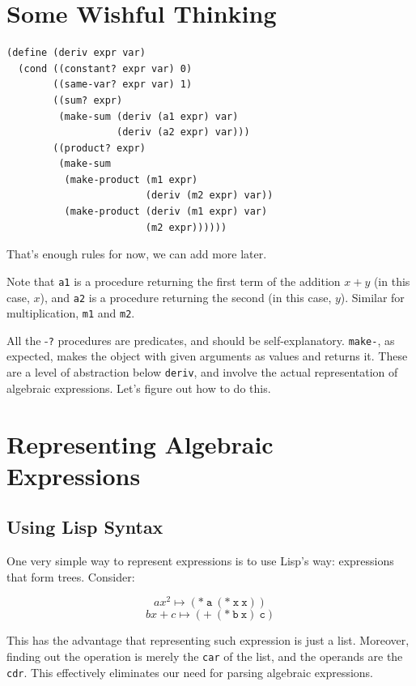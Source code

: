 \documentclass[9pt]{report}
\begin{document}
\section{Some Wishful Thinking}
\label{sec:org9d9e4e3}

\begin{verbatim}
(define (deriv expr var)
  (cond ((constant? expr var) 0)
        ((same-var? expr var) 1)
        ((sum? expr)
         (make-sum (deriv (a1 expr) var)
                   (deriv (a2 expr) var)))
        ((product? expr)
         (make-sum
          (make-product (m1 expr)
                        (deriv (m2 expr) var))
          (make-product (deriv (m1 expr) var)
                        (m2 expr))))))
\end{verbatim}


That's enough rules for now, we can add more later.

Note that \texttt{a1} is a procedure returning the first term of the
addition \(x+y\) (in this case, \(x\)), and \texttt{a2} is a procedure
returning the second (in this case, \(y\)). Similar for
multiplication, \texttt{m1} and \texttt{m2}.

All the -\texttt{?} procedures are predicates, and should be
self-explanatory. \texttt{make-}, as expected, makes the object with given
arguments as values and returns it. These are a level of
abstraction below \texttt{deriv}, and involve the actual representation of
algebraic expressions. Let's figure out how to do this.

\section{Representing Algebraic Expressions}
\label{sec:org93fdaf2}

\subsection{Using Lisp Syntax}
\label{sec:org3f5ed3e}

One very simple way to represent expressions is to use Lisp's way:
expressions that form trees. Consider:

$$ax^{2} \mapsto \mathtt{(*~a~(*~x~x))}$$ $$bx+c \mapsto \mathtt{(
    \mathtt{+} ~(*~b~x)~c)}$$

This has the advantage that representing such expression is just a
list. Moreover, finding out the operation is merely the \texttt{car} of
the list, and the operands are the \texttt{cdr}. This effectively
eliminates our need for parsing algebraic expressions.
\end{document}
